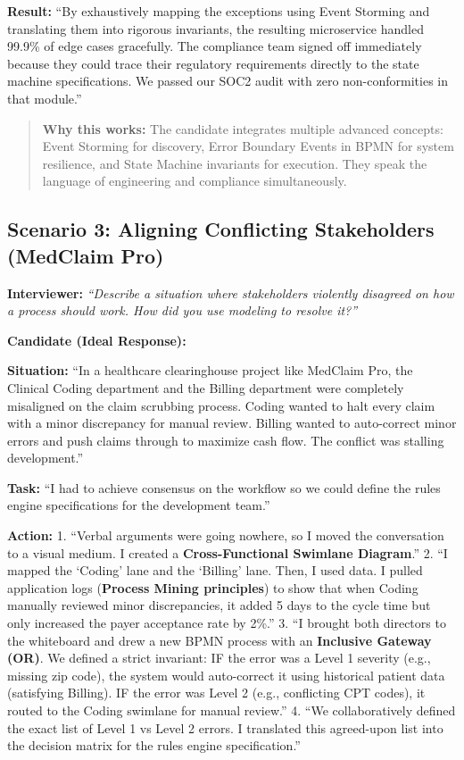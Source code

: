 \textbf{Result:} ``By exhaustively mapping the exceptions using Event
Storming and translating them into rigorous invariants, the resulting
microservice handled 99.9\% of edge cases gracefully. The compliance
team signed off immediately because they could trace their regulatory
requirements directly to the state machine specifications. We passed our
SOC2 audit with zero non-conformities in that module.''

\begin{quote}
\textbf{Why this works:} The candidate integrates multiple advanced
concepts: Event Storming for discovery, Error Boundary Events in BPMN
for system resilience, and State Machine invariants for execution. They
speak the language of engineering and compliance simultaneously.
\end{quote}

\subsection{Scenario 3: Aligning Conflicting Stakeholders (MedClaim
Pro)}\label{scenario-3-aligning-conflicting-stakeholders-medclaim-pro}

\textbf{Interviewer:} \emph{``Describe a situation where stakeholders
violently disagreed on how a process should work. How did you use
modeling to resolve it?''}

\textbf{Candidate (Ideal Response):}

\textbf{Situation:} ``In a healthcare clearinghouse project like
MedClaim Pro, the Clinical Coding department and the Billing department
were completely misaligned on the claim scrubbing process. Coding wanted
to halt every claim with a minor discrepancy for manual review. Billing
wanted to auto-correct minor errors and push claims through to maximize
cash flow. The conflict was stalling development.''

\textbf{Task:} ``I had to achieve consensus on the workflow so we could
define the rules engine specifications for the development team.''

\textbf{Action:} 1. ``Verbal arguments were going nowhere, so I moved
the conversation to a visual medium. I created a
\textbf{Cross-Functional Swimlane Diagram}.'' 2. ``I mapped the `Coding'
lane and the `Billing' lane. Then, I used data. I pulled application
logs (\textbf{Process Mining principles}) to show that when Coding
manually reviewed minor discrepancies, it added 5 days to the cycle time
but only increased the payer acceptance rate by 2\%.'' 3. ``I brought
both directors to the whiteboard and drew a new BPMN process with an
\textbf{Inclusive Gateway (OR)}. We defined a strict invariant: IF the
error was a Level 1 severity (e.g., missing zip code), the system would
auto-correct it using historical patient data (satisfying Billing). IF
the error was Level 2 (e.g., conflicting CPT codes), it routed to the
Coding swimlane for manual review.'' 4. ``We collaboratively defined the
exact list of Level 1 vs Level 2 errors. I translated this agreed-upon
list into the decision matrix for the rules engine specification.''

